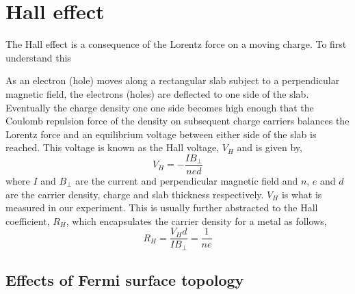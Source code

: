 
\section{Hall effect}

The Hall effect is a consequence of the Lorentz force on a moving charge. To first understand this





As an electron (hole) moves along a rectangular slab subject to a perpendicular magnetic field, the electrons (holes) are deflected to one side of the slab. Eventually the charge density one one side becomes high enough that the Coulomb repulsion force of the density on subsequent charge carriers balances the Lorentz force and an equilibrium voltage between either side of the slab is reached. This voltage is known as the Hall voltage, $V_H$ and is given by,
\begin{equation}
    V_H = -\frac{IB_{\perp}}{ned}
\end{equation}
where $I$ and $B_{\perp}$ are the current and perpendicular magnetic field and $n$, $e$ and $d$ are the carrier density, charge and slab thickness respectively. $V_H$ is what is measured in our experiment. This is usually further abstracted to the Hall coefficient, $R_H$, which encapsulates the carrier density for a metal as follows,
\begin{equation}
    R_H = \frac{V_H d}{IB_\perp} = \frac{1}{ne}
\end{equation}

% 

\subsection{Effects of Fermi surface topology}

